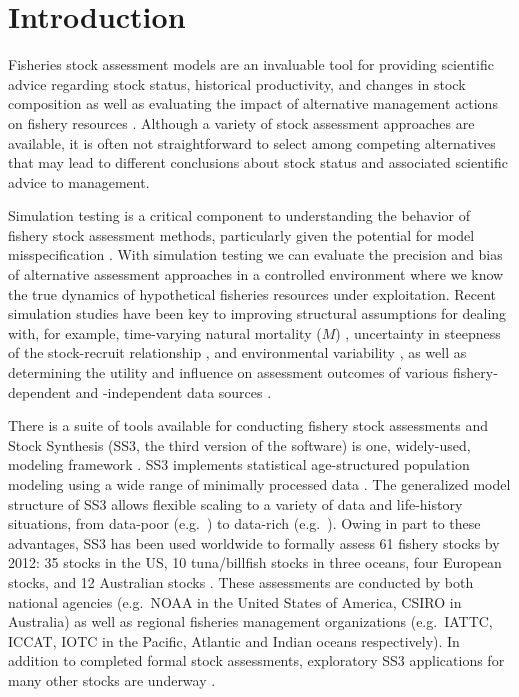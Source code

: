 \documentclass[10pt]{article}
\begin{document}
\section*{Introduction}

Fisheries stock assessment models are an invaluable tool for providing
scientific advice regarding stock status, historical productivity, and
changes in stock composition as well as evaluating the impact of alternative
management actions on fishery resources \cite{gulland1983, hilborn1992}.
Although a variety of stock assessment approaches are available, it is often
not straightforward to select among competing alternatives that may lead
to different conclusions about stock status and associated scientific
advice to management.

Simulation testing is a critical component to understanding the behavior of
fishery stock assessment methods, particularly given the potential for model
misspecification \cite{hilborn1987, hilborn1992, rosenberg1994, peterman2004,
  deroba2014}. With simulation testing we can evaluate the precision and bias
of alternative assessment approaches in a controlled environment where we know
the true dynamics of hypothetical fisheries resources under exploitation.
Recent simulation studies have been key to improving structural
assumptions for dealing with, for example, time-varying natural mortality ($M$)
\cite{lee2011, jiao2012, deroba2013, johnson2014}, uncertainty in
steepness of the stock-recruit relationship \cite{lee2012}, and environmental
variability \cite{schirripa2009}, as well as determining the utility and
influence on assessment outcomes of various fishery-dependent and -independent
data sources \cite{magnusson2007, wetzel2011a, ono2014, yin2004}.

There is a suite of tools available for conducting fishery stock
assessments and Stock Synthesis (SS3, the third version of the software) is
one, widely-used, modeling framework \cite{methot2013}. SS3 implements
statistical age-structured population modeling using a wide range of minimally
processed data \cite{maunder2013, methot2013}. The generalized model
structure of SS3 allows flexible scaling to a variety of data and life-history
situations, from data-poor (e.g.~\cite{wetzel2011a, cope2013}) to
data-rich (e.g.~\cite{haltuch2013}). Owing in part to these advantages,
SS3 has been used worldwide to formally assess 61 fishery stocks by 2012:
35 stocks in the US, 10 tuna/billfish stocks in three oceans, four European
stocks, and 12 Australian stocks \cite{methot2013}. These assessments are
conducted by both national agencies (e.g.~NOAA in the United States of America, CSIRO in Australia)
as well as regional fisheries management organizations (e.g.~IATTC, ICCAT, IOTC
in the Pacific, Atlantic and Indian oceans respectively). In addition to
completed formal stock assessments, exploratory SS3 applications for many other
stocks are underway \cite{methot2013}.
\end{document}
